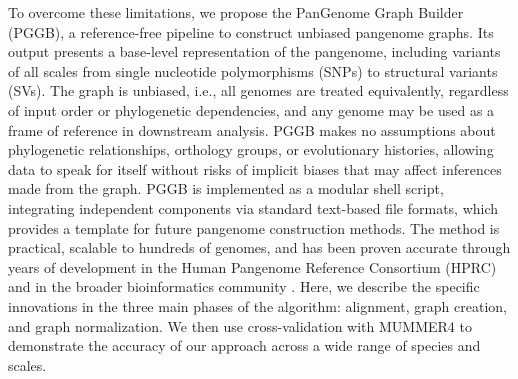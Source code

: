 \documentclass[pdflatex,mathphys]{jnl}%
\theoremstyle{thmstyleone}%
\theoremstyle{thmstyletwo}%
\theoremstyle{thmstylethree}%
\begin{document}
To overcome these limitations, we propose the PanGenome Graph Builder (PGGB), a reference-free pipeline to construct unbiased pangenome graphs.
Its output presents a base-level representation of the pangenome, including variants of all scales from single nucleotide polymorphisms (SNPs) to structural variants (SVs).
The graph is unbiased, i.e., all genomes are treated equivalently, regardless of input order or phylogenetic dependencies, and any genome may be used as a frame of reference in downstream analysis.
PGGB makes no assumptions about phylogenetic relationships, orthology groups, or evolutionary histories, allowing data to speak for itself without risks of implicit biases that may affect inferences made from the graph.
PGGB is implemented as a modular shell script, integrating independent components via standard text-based file formats, which provides a template for future pangenome construction methods.
The method is practical, scalable to hundreds of genomes, and has been proven accurate through years of development in the Human Pangenome Reference Consortium (HPRC) \cite{Liao_2023,Guarracino_2023} and in the broader bioinformatics community \cite{crysnanto2022comparison,Leonard_2022,Zhou_2022}.
Here, we describe the specific innovations in the three main phases of the algorithm: alignment, graph creation, and graph normalization.
We then use cross-validation with MUMMER4 \cite{Marcais_2018} to demonstrate the accuracy of our approach across a wide range of species and scales.
\end{document}
